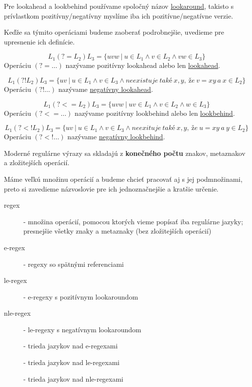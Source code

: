 Pre lookahead a lookbehind používame spoločný názov \underline{lookaround}, takisto s prívlastkom pozitívny/negatívny myslíme iba ich pozitívne/negatívne verzie.

Keďže sa týmito operáciami budeme zaoberať podrobnejšie, uvedieme pre upresnenie ich definície.

\begin{df}
$$ L_{1}(?=L_{2})L_{3} = \lbrace uvw ~|~ u \in L_{1} \land v \in L_{2} \land vw \in L_{3} \rbrace $$ Operáciu $(?=\dots)$ nazývame pozitívny lookahead alebo len \underline{lookahead}.
\end{df}

\begin{df}
$$ L_{1}(?!L_{2})L_{3} = \lbrace uv ~|~ u \in L_{1} \land v \in L_{3} \land neexistuje~také~x,y,~že~v=xy~a~x \in L_2 \rbrace $$ Operáciu $(?!\dots)$ nazývame \underline{negatívny lookahead}.
\end{df}

\begin{df}
$$ L_{1}(?<=L_{2})L_{3} = \lbrace uvw ~|~ uv \in L_{1} \land v \in L_{2} \land w \in L_{3} \rbrace $$ Operáciu $(?<=\dots)$ nazývame pozitívny lookbehind alebo len \underline{lookbehind}.
\end{df}

\begin{df}
$$ L_{1}(?<!L_{2})L_{3} = \lbrace uv ~|~ u \in L_{1} \land v \in L_{3} \land neexituje~také~x,y,~že~u=xy~a~y \in L_2 \rbrace $$ Operáciu $(?<!\dots)$ nazývame \underline{negatívny lookbehind}.
\end{df}

Moderné regulárne výrazy sa skladajú z \textbf{konečného počtu} znakov, metaznakov a zložitejších operácií.

Máme veľkú množinu operácií a budeme chcieť pracovať aj s jej podmnožinami, preto si zavedieme názvoslovie pre ich jednoznačnejšie a kratšie určenie.

\begin{description}
\item[regex] - množina operácií, pomocou ktorých vieme popísať iba regulárne jazyky; presnejšie všetky znaky a metaznaky (bez zložitejších operácií)
\item[e-regex] - regexy so spätnými referenciami
\item[le-regex] - e-regexy s pozitívnym lookaroundom
\item[nle-regex] - le-regexy s negatívnym lookaroundom
\item[\e] - trieda jazykov nad e-regexami
\item[\le] - trieda jazykov nad le-regexami
\item[\nle] - trieda jazykov nad nle-regexami
\end{description}

